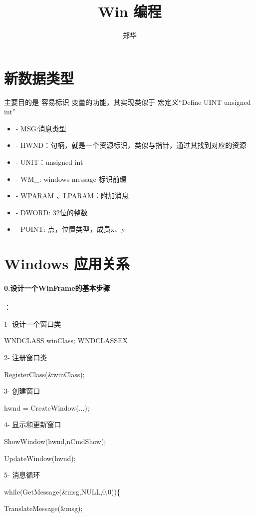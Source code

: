 \documentclass[UTF8,a4paper,8pt]{ctexart}
\author{郑华}
\title{Win 编程}
\begin{document}
	\maketitle

   
\section{新数据类型}主要目的是 容易标识 变量的功能，其实现类似于 宏定义“Define UINT  unsigned int”
     \begin{itemize}
     	\item - MSG:消息类型
     	\item - HWND：句柄，就是一个资源标识，类似与指针，通过其找到对应的资源
     	\item - UNIT：unsigned int
     	\item - WM\_: windows message 标识前缀 
     	\item - WPARAM 、LPARAM：附加消息
     	\item - DWORD: 32位的整数
     	\item - POINT: 点，位置类型，成员x、y
     \end{itemize}  
 	
\section{Windows 应用关系}	 

   	\paragraph {0.设计一个WinFrame的基本步骤}：
   	
		   	1- 设计一个窗口类
		   	
		   	  WNDCLASS  winClass; WNDCLASSEX
		   	  
		   	2- 注册窗口类
		   	
		   	  RegisterClass(\&winClass);
		   	  
		   	3- 创建窗口
		   	
		   	  hwnd = CreateWindow(...);
		   	  
		   	4- 显示和更新窗口
		   	
		   	  ShowWindow(hwnd,nCmdShow);
		 
		   	  UpdateWindow(hwnd);
		   	  
		   	5- 消息循环
		   	
		   	  while(GetMessage(\&msg,NULL,0,0))\{
		   	  	
		   	  	TranslateMessage(\&msg);
		   	  	
\end{document}
